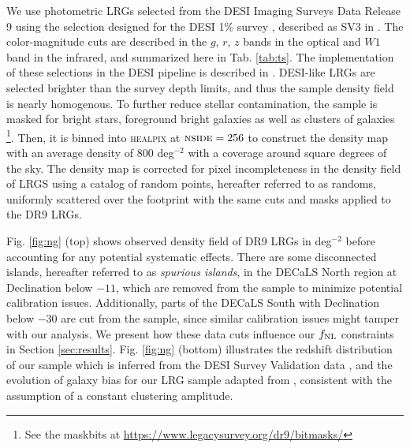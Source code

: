 We use photometric LRGs selected from the DESI Imaging Surveys Data Release 9 \citep[DR9;][]{dey2018overview} using the selection designed for the DESI 1\% survey , described as SV3 in \cite{zhou2022target}. The color-magnitude cuts are described in the $g$, $r$, $z$ bands in the optical and $W1$ band in the infrared, and summarized here in Tab. \ref{tab:ts}. The implementation of these selections in the DESI pipeline is described in . DESI-like LRGs are selected brighter than the survey depth limits, and thus the sample density field is nearly homogenous. To further reduce stellar contamination, the sample is masked for bright stars, foreground bright galaxies as well as clusters of galaxies \footnote{See the maskbits at \url{https://www.legacysurvey.org/dr9/bitmasks/}}. Then, it is binned into \textsc{healpix} \citep{gorski2005healpix} at $\textsc{nside}=256$ to construct the density map with an average density of $800$ deg$^{-2}$ with a coverage around  square degrees of the sky. The density map is corrected for pixel incompleteness in the density field of LRGS using a catalog of random points, hereafter referred to as randoms, uniformly scattered over the footprint with the same cuts and masks applied to the DR9 LRGs. 

Fig. \ref{fig:ng} (top) shows observed density field of DR9 LRGs in deg$^{-2}$ before accounting for any potential systematic effects. There are some disconnected islands, hereafter referred to as \textit{spurious islands}, in the DECaLS North region at Declination below $-11$, which are removed from the sample to minimize potential calibration issues. Additionally, parts of the DECaLS South with Declination below $-30$ are cut from the sample, since similar calibration issues might tamper with our analysis. We present  how these data cuts influence our $f_{\rm NL}$ constraints in Section \ref{sec:results}. Fig. \ref{fig:ng} (bottom) illustrates the redshift distribution of our sample which is inferred from the DESI Survey Validation data , and the evolution of  galaxy bias for our LRG sample adapted from \cite{zhou2021clustering}, consistent with the assumption of a constant clustering amplitude.

